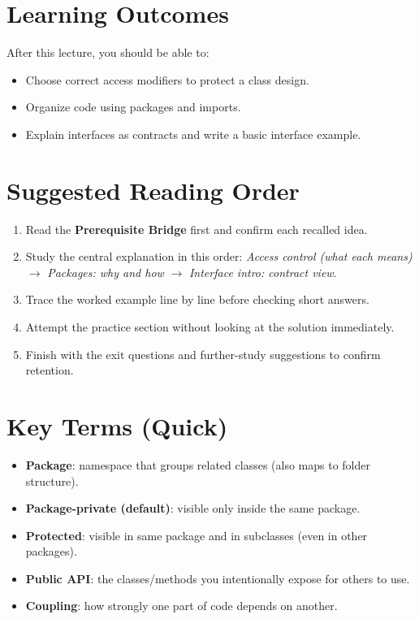 \documentclass[11pt]{article}
\begin{document}
\section{Learning Outcomes}
After this lecture, you should be able to:
\begin{itemize}
  \item Choose correct access modifiers to protect a class design.
  \item Organize code using packages and imports.
  \item Explain interfaces as contracts and write a basic interface example.
\end{itemize}

\section{Suggested Reading Order}
\begin{enumerate}
  \item Read the \textbf{Prerequisite Bridge} first and confirm each recalled idea.
  \item Study the central explanation in this order: \textit{Access control (what each means)} $\rightarrow$ \textit{Packages: why and how} $\rightarrow$ \textit{Interface intro: contract view}.
  \item Trace the worked example line by line before checking short answers.
  \item Attempt the practice section without looking at the solution immediately.
  \item Finish with the exit questions and further-study suggestions to confirm retention.
\end{enumerate}
\notesources{\OOPSUnitIISources}

\section{Key Terms (Quick)}
\begin{itemize}
  \item \textbf{Package}: namespace that groups related classes (also maps to folder structure).
  \item \textbf{Package-private (default)}: visible only inside the same package.
  \item \textbf{Protected}: visible in same package and in subclasses (even in other packages).
  \item \textbf{Public API}: the classes/methods you intentionally expose for others to use.
  \item \textbf{Coupling}: how strongly one part of code depends on another.
\end{itemize}
\end{document}
